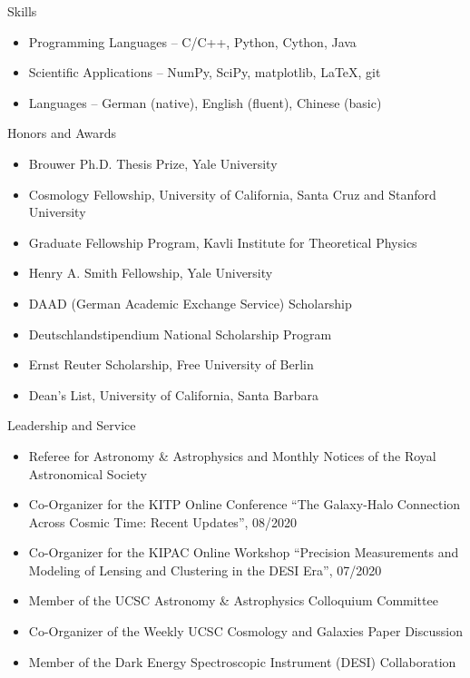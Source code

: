 \documentclass{resume}
\begin{document}
\begin{rSection}{Skills}
  \begin{itemize}[leftmargin=1.0cm, topsep=0pt, itemsep=0pt, partopsep=0pt, parsep=0pt]
    \item Programming Languages – C/C++, Python, Cython, Java
    \item Scientific Applications – NumPy, SciPy, matplotlib, LaTeX, git
    \item Languages – German (native), English (fluent), Chinese (basic)
  \end{itemize}
\end{rSection}

\begin{rSection}{Honors and Awards}
  \begin{itemize}[leftmargin=1.0cm, topsep=0pt, itemsep=0pt, partopsep=0pt, parsep=0pt]
    \item Brouwer Ph.D. Thesis Prize, Yale University
    \item Cosmology Fellowship, University of California, Santa Cruz and Stanford University
    \item Graduate Fellowship Program, Kavli Institute for Theoretical Physics
    \item Henry A. Smith Fellowship, Yale University
    \item DAAD (German Academic Exchange Service) Scholarship
    \item Deutschlandstipendium National Scholarship Program
    \item Ernst Reuter Scholarship, Free University of Berlin
    \item Dean's List, University of California, Santa Barbara
  \end{itemize}
\end{rSection}

\begin{rSection}{Leadership and Service}
  \begin{itemize}[leftmargin=1.0cm, topsep=0pt, itemsep=0pt, partopsep=0pt, parsep=0pt]
    \item Referee for Astronomy \& Astrophysics and Monthly Notices of the Royal Astronomical Society
    \item Co-Organizer for the KITP Online Conference ``The Galaxy-Halo Connection Across Cosmic Time: Recent Updates'', 08/2020
    \item Co-Organizer for the KIPAC Online Workshop ``Precision Measurements and Modeling of Lensing and Clustering in the DESI Era'', 07/2020
    \item Member of the UCSC Astronomy \& Astrophysics Colloquium Committee
    \item Co-Organizer of the Weekly UCSC Cosmology and Galaxies Paper Discussion
    \item Member of the Dark Energy Spectroscopic Instrument (DESI) Collaboration
  \end{itemize}
\end{rSection}
\end{document}
